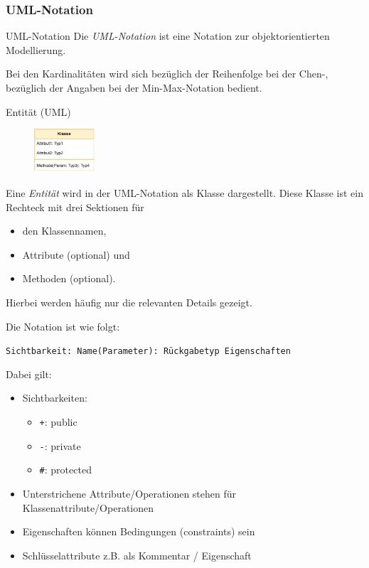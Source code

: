 \newpage
\subsubsection{UML-Notation}

\begin{defi}{UML-Notation}
    Die \emph{UML-Notation} ist eine Notation zur objektorientierten Modellierung.

    Bei den Kardinalitäten wird sich bezüglich der Reihenfolge bei der Chen-, bezüglich der Angaben bei der Min-Max-Notation bedient.
\end{defi}

\begin{defi}{Entität (UML)}
    \begin{figure}
        \begin{center}
            \includegraphics[width=0.2\textwidth]{includes/figures/definition_uml_entity.pdf}
        \end{center}
    \end{figure}
    Eine \emph{Entität} wird in der UML-Notation als Klasse dargestellt.
    Diese Klasse ist ein Rechteck mit drei Sektionen für
    \begin{itemize}
        \item den Klassennamen,
        \item Attribute (optional) und
        \item Methoden (optional).
    \end{itemize}
    Hierbei werden häufig nur die relevanten Details gezeigt.

    Die Notation ist wie folgt:
    \begin{center}
        \texttt{Sichtbarkeit: Name(Parameter): Rückgabetyp {Eigenschaften}}
    \end{center}

    Dabei gilt:
    \begin{itemize}
        \item Sichtbarkeiten:
              \begin{itemize}
                  \item \texttt{+}: public
                  \item \texttt{-}: private
                  \item \texttt{\#}: protected
              \end{itemize}
        \item Unterstrichene Attribute/Operationen stehen für Klassenattribute/Operationen
        \item Eigenschaften können Bedingungen (constraints) sein
        \item Schlüsselattribute z.B. als Kommentar / Eigenschaft
    \end{itemize}
\end{defi}

